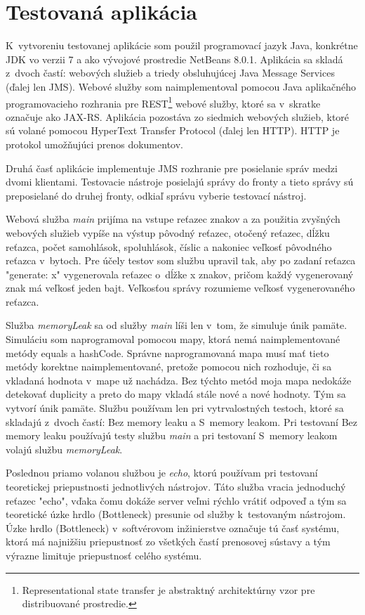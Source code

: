 \documentclass[12pt,oneside,final]{fithesis-utf8}
\begin{document}
\section{Testovaná aplikácia}
K~vytvoreniu testovanej aplikácie som použil programovací jazyk Java, konkrétne JDK vo verzii 7 a ako vývojové prostredie NetBeans 8.0.1. Aplikácia sa skladá z~dvoch častí: webových služieb a triedy obsluhujúcej Java Message Services (ďalej len JMS). Webové služby som naimplementoval pomocou Java aplikačného programovacieho rozhrania pre REST\footnote{Representational state transfer je abstraktný architektúrny vzor pre distribuované prostredie.} webové služby, ktoré sa v~skratke označuje ako JAX-RS. Aplikácia pozostáva zo siedmich webových služieb, ktoré sú volané pomocou HyperText Transfer Protocol (ďalej len HTTP). HTTP je protokol umožňujúci prenos dokumentov\cite{HTTP}.
\par Druhá časť aplikácie implementuje JMS rozhranie pre posielanie správ medzi dvomi klientami. Testovacie nástroje posielajú správy do fronty a tieto správy sú preposielané do druhej fronty, odkiaľ správu vyberie testovací nástroj.
\par Webová služba \textit{main} prijíma na vstupe reťazec znakov a za použitia zvyšných webových služieb vypíše na výstup pôvodný reťazec, otočený reťazec, dĺžku reťazca, počet samohlások, spoluhlások, číslic a nakoniec veľkosť pôvodného reťazca v~bytoch. Pre účely testov som službu upravil tak, aby po zadaní reťazca "{}generate: x" vygenerovala reťazec o~dĺžke x znakov, pričom každý vygenerovaný znak má veľkosť jeden bajt. Veľkosťou správy rozumieme veľkosť vygenerovaného reťazca.
\par Služba \textit{memoryLeak} sa od služby \textit{main} líši len v~tom, že simuluje únik pamäte. Simuláciu som naprogramoval pomocou mapy, ktorá nemá naimplementované metódy equals a hashCode. Správne naprogramovaná mapa musí mať tieto metódy korektne naimplementované, pretože pomocou nich rozhoduje, či sa vkladaná hodnota v~mape už nachádza. Bez týchto metód moja mapa nedokáže detekovať duplicity a preto do mapy vkladá stále nové a nové hodnoty. Tým sa vytvorí únik pamäte. Službu používam len pri vytrvalostných testoch, ktoré sa skladajú z~dvoch častí: Bez memory leaku a S~memory leakom. Pri testovaní Bez memory leaku používajú testy službu \textit{main} a pri testovaní S~memory leakom volajú službu \textit{memoryLeak}.
\par Poslednou priamo volanou službou je \textit{echo}, ktorú používam pri testovaní teoretickej priepustnosti jednotlivých nástrojov. Táto služba vracia jednoduchý reťazec "{}echo", vďaka čomu dokáže server veľmi rýchlo vrátiť odpoveď a tým sa teoretické úzke hrdlo (Bottleneck) presunie od služby k~testovaným nástrojom. Úzke hrdlo (Bottleneck) v~softvérovom inžinierstve označuje tú časť systému, ktorá má najnižšiu priepustnosť zo všetkých častí prenosovej sústavy a tým výrazne limituje priepustnosť celého systému\cite{Wescott}.
\end{document}
